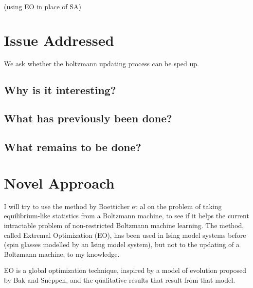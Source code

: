 \documentclass[12pt]{article}
\begin{document}
  (using EO in place of SA)


\section*{Issue Addressed} %

We ask whether the boltzmann updating process can be sped up.

\subsection*{Why is it interesting?}
\subsection*{What has previously been done?}
\subsection*{What remains to be done?}

\section{Novel Approach}

I will try to use the method by Boetticher et al on the problem of taking equilibrium-like statistics from a Boltzmann machine, to see if it helps the current intractable problem of non-restricted Boltzmann machine learning. The method, called Extremal Optimization (EO), has been used in Ising model systems before (spin glasses modelled by an Ising model system), but not to the updating of a Boltzmann machine, to my knowledge. %

EO is a global optimization technique, inspired by a model of evolution proposed by Bak and Sneppen, and the qualitative results that result from that model. %


\end{document}
